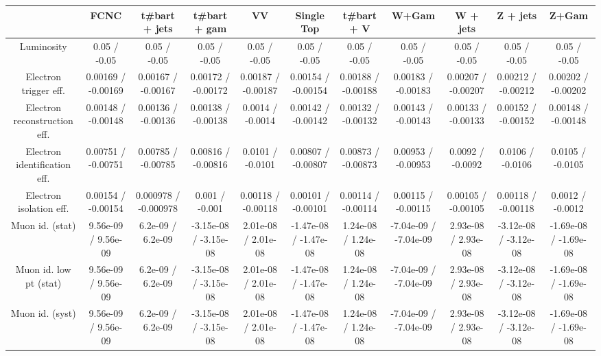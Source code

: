 \begin{table}[htbp]
\begin{center}
\footnotesize
\begin{tabular}{|c|c|c|c|c|c|c|c|c|c|c|}
\hline 
      & FCNC      & t#bar{t} + jets      & t#bar{t} +  gam      & VV      & Single Top      & t#bar{t} + V      & W+Gam      & W + jets      & Z + jets      & Z+Gam \\ 
\hline 
  Luminosity & 0.05 / -0.05 & 0.05 / -0.05 & 0.05 / -0.05 & 0.05 / -0.05 & 0.05 / -0.05 & 0.05 / -0.05 & 0.05 / -0.05 & 0.05 / -0.05 & 0.05 / -0.05 & 0.05 / -0.05 \\ 
  Electron trigger eff. & 0.00169 / -0.00169 & 0.00167 / -0.00167 & 0.00172 / -0.00172 & 0.00187 / -0.00187 & 0.00154 / -0.00154 & 0.00188 / -0.00188 & 0.00183 / -0.00183 & 0.00207 / -0.00207 & 0.00212 / -0.00212 & 0.00202 / -0.00202 \\ 
  Electron reconstruction eff. & 0.00148 / -0.00148 & 0.00136 / -0.00136 & 0.00138 / -0.00138 & 0.0014 / -0.0014 & 0.00142 / -0.00142 & 0.00132 / -0.00132 & 0.00143 / -0.00143 & 0.00133 / -0.00133 & 0.00152 / -0.00152 & 0.00148 / -0.00148 \\ 
  Electron identification eff. & 0.00751 / -0.00751 & 0.00785 / -0.00785 & 0.00816 / -0.00816 & 0.0101 / -0.0101 & 0.00807 / -0.00807 & 0.00873 / -0.00873 & 0.00953 / -0.00953 & 0.0092 / -0.0092 & 0.0106 / -0.0106 & 0.0105 / -0.0105 \\ 
  Electron isolation eff. & 0.00154 / -0.00154 & 0.000978 / -0.000978 & 0.001 / -0.001 & 0.00118 / -0.00118 & 0.00101 / -0.00101 & 0.00114 / -0.00114 & 0.00115 / -0.00115 & 0.00105 / -0.00105 & 0.00118 / -0.00118 & 0.0012 / -0.0012 \\ 
  Muon id. (stat) & 9.56e-09 / 9.56e-09 & 6.2e-09 / 6.2e-09 & -3.15e-08 / -3.15e-08 & 2.01e-08 / 2.01e-08 & -1.47e-08 / -1.47e-08 & 1.24e-08 / 1.24e-08 & -7.04e-09 / -7.04e-09 & 2.93e-08 / 2.93e-08 & -3.12e-08 / -3.12e-08 & -1.69e-08 / -1.69e-08 \\ 
  Muon id. low pt (stat) & 9.56e-09 / 9.56e-09 & 6.2e-09 / 6.2e-09 & -3.15e-08 / -3.15e-08 & 2.01e-08 / 2.01e-08 & -1.47e-08 / -1.47e-08 & 1.24e-08 / 1.24e-08 & -7.04e-09 / -7.04e-09 & 2.93e-08 / 2.93e-08 & -3.12e-08 / -3.12e-08 & -1.69e-08 / -1.69e-08 \\ 
  Muon id. (syst) & 9.56e-09 / 9.56e-09 & 6.2e-09 / 6.2e-09 & -3.15e-08 / -3.15e-08 & 2.01e-08 / 2.01e-08 & -1.47e-08 / -1.47e-08 & 1.24e-08 / 1.24e-08 & -7.04e-09 / -7.04e-09 & 2.93e-08 / 2.93e-08 & -3.12e-08 / -3.12e-08 & -1.69e-08 / -1.69e-08 \\ 

\end{tabular}
\end{center}
\end{table}
